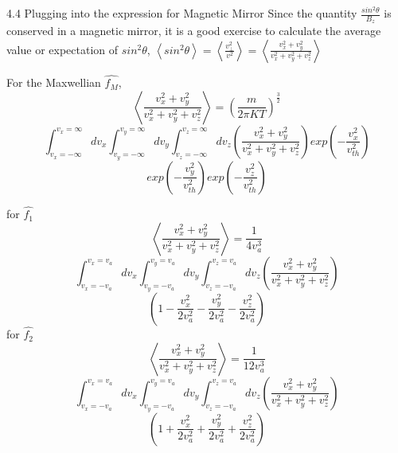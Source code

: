 \documentclass{beamer}
\begin{document}
	\begin{frame}[t]{4.4 Plugging into the expression for Magnetic Mirror}
			\noindent Since the quantity $\frac{\displaystyle sin^{2}\theta}{\displaystyle B_{z}}$ is conserved in a magnetic mirror, it is a good exercise to calculate the average value or expectation of $sin^{2}\theta$, $\left\langle sin^{2}\theta\right\rangle = \left\langle \frac{\displaystyle v_{\perp}^{2}}{\displaystyle v^{2}}\right\rangle = \left\langle \frac{\displaystyle v_{x}^{2} + v_{y}^{2}}{\displaystyle v_{x}^{2} + v_{y}^{2} +  v_{z}^{2}}\right\rangle $ 
			
			For the Maxwellian $\widehat{f_{M}}$,
			$$\left\langle \frac{\displaystyle v_{x}^{2} + v_{y}^{2}}{\displaystyle v_{x}^{2} + v_{y}^{2} +  v_{z}^{2}}\right\rangle = \left(\frac{m}{2\pi KT}\right)^{\frac{3}{2}} $$ 
			$$ \int_{v_{x} = - \infty}^{v_{x} = \infty} d v_{x} \int_{v_{y} = - \infty}^{v_{y} = \infty} d v_{y} \int_{v_{z} = - \infty}^{v_{z} = \infty} d v_{z} \left( \frac{\displaystyle v_{x}^{2} + v_{y}^{2}}{\displaystyle v_{x}^{2} + v_{y}^{2} + v_{z}^{2}} \right)  exp \left(-\frac{v_{x}^{2}}{v_{th}^{2}}\right) $$ $$ exp \left(-\frac{v_{y}^{2}}{v_{th}^{2}}\right) exp\left(-\frac{v_{z}^{2}}{v_{th}^{2}}\right)$$
		
	\end{frame}

	\begin{frame}
		for $\hat{f_{1}}$
		$$\left\langle \frac{\displaystyle v_{x}^{2} + v_{y}^{2}}{\displaystyle v_{x}^{2} + v_{y}^{2} +  v_{z}^{2}}\right\rangle = \frac{1}{4 v_{a}^{3}} $$ $$\int_{v_{x} = - v_{a}}^{v_{x} = v_{a}} d v_{x} \int_{v_{y} = - v_{a}}^{v_{y} = v_{a}} d v_{y} \int_{v_{z} = - v_{a}}^{v_{z} = v_{a}} d v_{z} \left( \frac{\displaystyle v_{x}^{2} + v_{y}^{2}}{\displaystyle v_{x}^{2} + v_{y}^{2} + v_{z}^{2}} \right)$$ $$  \left(1 - \frac{v_{x}^{2}}{2 v_{a}^2} - \frac{v_{y}^{2}}{2 v_{a}^2} - \frac{v_{z}^{2}}{2 v_{a}^2} \right) $$
		for $\hat{f_{2}}$
		$$\left\langle \frac{\displaystyle v_{x}^{2} + v_{y}^{2}}{\displaystyle v_{x}^{2} + v_{y}^{2} +  v_{z}^{2}}\right\rangle = \frac{1}{12 v_{a}^{3}} $$ $$\int_{v_{x} = - v_{a}}^{v_{x} = v_{a}} d v_{x} \int_{v_{y} = - v_{a}}^{v_{y} = v_{a}} d v_{y} \int_{v_{z} = - v_{a}}^{v_{z} = v_{a}} d v_{z} \left( \frac{\displaystyle v_{x}^{2} + v_{y}^{2}}{\displaystyle v_{x}^{2} + v_{y}^{2} + v_{z}^{2}} \right) $$ $$ \left(1 + \frac{v_{x}^{2}}{2 v_{a}^2} + \frac{v_{y}^{2}}{2 v_{a}^2} + \frac{v_{z}^{2}}{2 v_{a}^2} \right) $$
		
	\end{frame}
\end{document}
